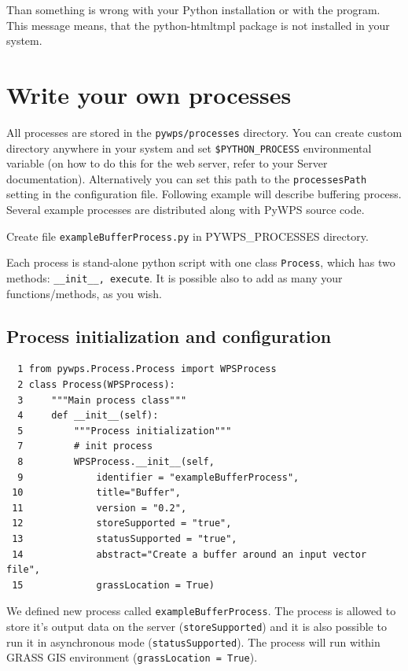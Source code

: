 \documentclass[a4paper,11pt]{article}
\begin{document}
     
Than something is wrong with your Python installation or with the program.
This message means, that the python-htmltmpl package is not installed in
your system.
     
\section{Write your own processes}
\label{processes}
    
All processes are stored in the \texttt{pywps/processes} directory. You can
create custom directory anywhere in your system and set
\texttt{\$PYTHON\_PROCESS} environmental variable (on how to do this for the web
server, refer to your Server documentation). Alternatively you can set this path to 
the \texttt{processesPath} setting in the configuration file.
Following example will describe buffering process. Several example processes are 
distributed along with PyWPS source code.

Create file \texttt{exampleBufferProcess.py} in PYWPS\_PROCESSES directory.
    
Each process is stand-alone python script with one class \texttt{Process},
which has two methods: \texttt{\_\_init\_\_, execute}. It is possible also to add as 
many your functions/methods, as you wish.
    
\subsection{Process initialization and configuration}

\begin{verbatim}
  1 from pywps.Process.Process import WPSProcess                                
  2 class Process(WPSProcess):
  3     """Main process class"""
  4     def __init__(self):
  5         """Process initialization"""
  7         # init process
  8         WPSProcess.__init__(self,
  9             identifier = "exampleBufferProcess",
 10             title="Buffer",
 11             version = "0.2",
 12             storeSupported = "true",
 13             statusSupported = "true",
 14             abstract="Create a buffer around an input vector file",
 15             grassLocation = True)
\end{verbatim}

We defined new process called \texttt{exampleBufferProcess}. The process is allowed to
store it's output data on the server (\texttt{storeSupported}) and it is also possible to run it in
asynchronous mode (\texttt{statusSupported}). The process will run within
GRASS GIS environment (\texttt{grassLocation = True}).
     
\end{document}
